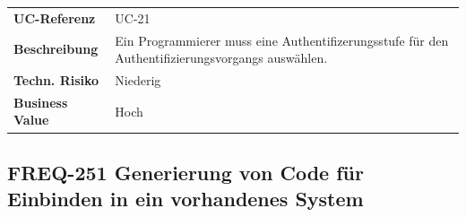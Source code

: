 \begin{longtable}[c]{@{}ll@{}}
\toprule
\begin{minipage}[t]{0.20\columnwidth}\raggedright\strut
\textbf{UC-Referenz}
\strut\end{minipage} &
\begin{minipage}[t]{0.74\columnwidth}\raggedright\strut
UC-21
\strut\end{minipage}\tabularnewline
\begin{minipage}[t]{0.20\columnwidth}\raggedright\strut
\textbf{Beschreibung}
\strut\end{minipage} &
\begin{minipage}[t]{0.74\columnwidth}\raggedright\strut
Ein Programmierer muss eine Authentifizerungsstufe für den
Authentifizierungsvorgangs auswählen.
\strut\end{minipage}\tabularnewline
\begin{minipage}[t]{0.20\columnwidth}\raggedright\strut
\textbf{Techn. Risiko}
\strut\end{minipage} &
\begin{minipage}[t]{0.74\columnwidth}\raggedright\strut
Niederig
\strut\end{minipage}\tabularnewline
\begin{minipage}[t]{0.20\columnwidth}\raggedright\strut
\textbf{Business Value}
\strut\end{minipage} &
\begin{minipage}[t]{0.74\columnwidth}\raggedright\strut
Hoch
\strut\end{minipage}\tabularnewline
\bottomrule
\end{longtable}

\subsection{FREQ-251 Generierung von Code für Einbinden in ein
vorhandenes
System}\label{freq-251-generierung-von-code-fuxfcr-einbinden-in-ein-vorhandenes-system}

